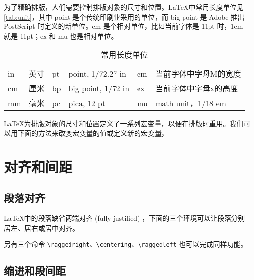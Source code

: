为了精确排版，人们需要控制排版对象的尺寸和位置。\LaTeX 中常用长度单位见 \autoref{tab:unit}，其中 point 是个传统印刷业采用的单位，而 big point 是 Adobe 推出 PostScript 时定义的新单位。em 是个相对单位，比如当前字体是 11pt 时，1em 就是 11pt；ex 和 mu 也是相对单位。

\begin{table}[htbp]
\caption{常用长度单位}
\label{tab:unit}
\centering
\begin{tabular}{llllll}
  \toprule
  in & 英寸 & pt & point, 1/72.27 in  & em & 当前字体中字母M的宽度 \\
  cm & 厘米 & bp & big point, 1/72 in & ex & 当前字体中字母x的高度 \\
  mm & 毫米 & pc & pica, 12 pt        & mu & math unit，1/18 em \\
  \bottomrule
\end{tabular}
\end{table}

\LaTeX 为排版对象的尺寸和位置定义了一系列宏变量，以便在排版时重用。我们可以用下面的方法来改变宏变量的值或定义新的宏变量，

\begin{Code}[]
\setlength{`变量名`}   %
\addtolength{`变量名`} %
\end{Code}

\section{对齐和间距}

\subsection{段落对齐}

\LaTeX 中的段落缺省两端对齐 (fully justified) ，下面的三个环境可以让段落分别居左、居右或居中对齐。

另有三个命令 \verb|\raggedright|、\verb|\centering|、\verb|\raggedleft| 也可以完成同样功能。

\begin{example}[h]
\caption{段落对齐方式}
\end{example}

\subsection{缩进和段间距}
\label{sec:parskip}

